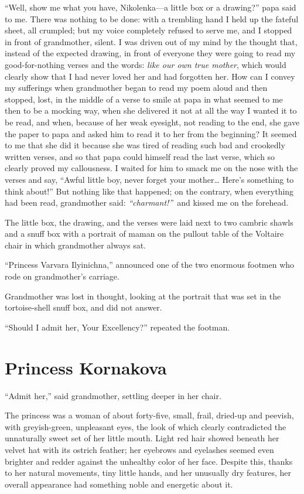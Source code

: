 ``Well, show me what you have, Nikolenka---a little box or a drawing?'' papa said to me. There was nothing to be done: with a trembling hand I held up the fateful sheet, all crumpled; but my voice completely refused to serve me, and I stopped in front of grandmother, silent. I was driven out of my mind by the thought that, instead of the expected drawing, in front of everyone they were going to read my good-for-nothing verses and the words: \textit{like our own true mother}, which would clearly show that I had never loved her and had forgotten her. How can I convey my sufferings when grandmother began to read my poem aloud and then stopped, lost, in the middle of a verse to smile at papa in what seemed to me then to be a mocking way, when she delivered it not at all the way I wanted it to be read, and when, because of her weak eyesight, not reading to the end, she gave the paper to papa and asked him to read it to her from the beginning? It seemed to me that she did it because she was tired of reading such bad and crookedly written verses, and so that papa could himself read the last verse, which so clearly proved my callousness. I waited for him to smack me on the nose with the verses and say, ``Awful little boy, never forget your mother\ldots{} Here's something to think about!'' But nothing like that happened; on the contrary, when everything had been read, grandmother said: \textit{``charmant!''}~and kissed me on the forehead. %

The little box, the drawing, and the verses were laid next to two cambric shawls and a snuff box with a portrait of maman on the pullout table of the Voltaire chair in which grandmother always sat.

``Princess Varvara Ilyinichna,'' announced one of the two enormous footmen who rode on grandmother's carriage. %

Grandmother was lost in thought, looking at the portrait that was set in the tortoise-shell snuff box, and did not answer.

``Should I admit her, Your Excellency?'' repeated the footman.

\chapter{Princess Kornakova} %

``Admit her,'' said grandmother, settling deeper in her chair.

The princess was a woman of about forty-five, small, frail, dried-up and peevish, with greyish-green, unpleasant eyes, the look of which clearly contradicted the unnaturally sweet set of her little mouth. Light red hair showed beneath her velvet hat with its ostrich feather; her eyebrows and eyelashes seemed even brighter and redder against the unhealthy color of her face. Despite this, thanks to her natural movements, tiny little hands, and her unusually dry features, her overall appearance had something noble and energetic about it.


